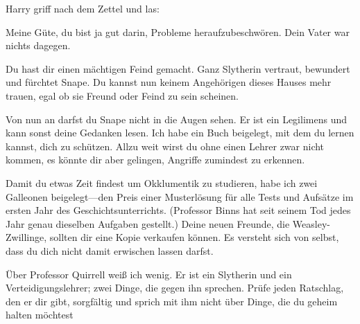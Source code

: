 Harry griff nach dem Zettel und las:

\begin{writtenNote}
Meine Güte, du bist ja gut darin, Probleme heraufzubeschwören. Dein Vater war nichts dagegen.

Du hast dir einen mächtigen Feind gemacht. Ganz Slytherin vertraut, bewundert und fürchtet Snape. Du kannst nun keinem Angehörigen dieses Hauses mehr trauen, egal ob sie Freund oder Feind zu sein scheinen.

Von nun an darfst du Snape nicht in die Augen sehen. Er ist ein Legilimens und kann sonst deine Gedanken lesen. Ich habe ein Buch beigelegt, mit dem du lernen kannst, dich zu schützen. Allzu weit wirst du ohne einen Lehrer zwar nicht kommen, es könnte dir aber gelingen, Angriffe zumindest zu erkennen.

Damit du etwas Zeit findest um Okklumentik zu studieren, habe ich zwei Galleonen beigelegt—den Preis einer Musterlösung für alle Tests und Aufsätze im ersten Jahr des Geschichtsunterrichts. (Professor Binns hat seit seinem Tod jedes Jahr genau dieselben Aufgaben gestellt.) Deine neuen Freunde, die Weasley-Zwillinge, sollten dir eine Kopie verkaufen können. Es versteht sich von selbst, dass du dich nicht damit erwischen lassen darfst.

Über Professor Quirrell weiß ich wenig. Er ist ein Slytherin und ein Verteidigungslehrer; zwei Dinge, die gegen ihn sprechen. Prüfe jeden Ratschlag, den er dir gibt, sorgfältig und sprich mit ihm nicht über Dinge, die du geheim halten möchtest


\end{writtenNote}
